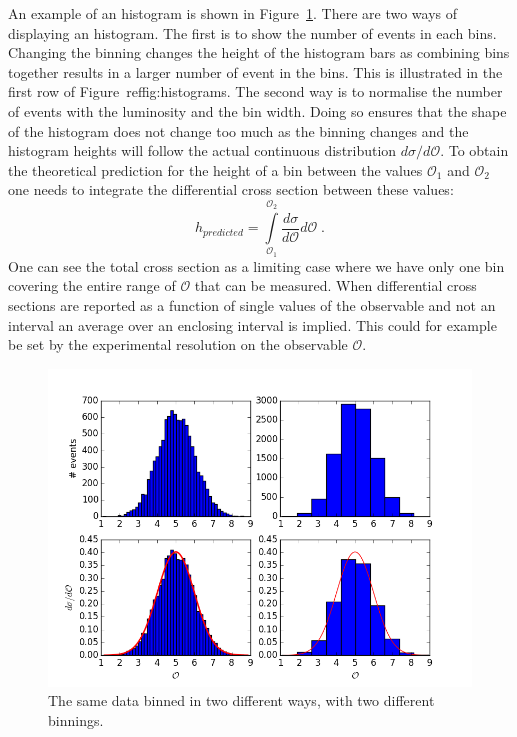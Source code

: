 \documentclass[12pt]{article}
\begin{document}
An example of an histogram is shown in Figure~\ref{fig:histograms}. There are two ways of displaying an histogram. The first is to show the number of events in each bins. Changing the binning changes the height of the histogram bars as combining bins together results in a larger number of event in the bins. This is illustrated in the first row of Figure~ref{fig:histograms}. The second way is to normalise the number of events with the luminosity and the bin width. Doing so ensures that the shape of the histogram does not change too much as the binning changes and the histogram heights will follow the actual continuous distribution $d\sigma/d\mathcal{O}$. To obtain the theoretical prediction for the height of a bin between the values $\mathcal{O}_1$ and $\mathcal{O}_2$ one needs to integrate the differential cross section between these values:
\[h_{predicted}=\int\limits_{\mathcal{O}_1}^{\mathcal{O}_2}\frac{d\sigma}{d\mathcal{O}}d\mathcal{O}\;.\]
One can see the total cross section as a limiting case where we have only one bin covering the entire range of $\mathcal{O}$ that can be measured. When differential cross sections are reported as a function of single values of the observable and not an interval an average over an enclosing interval is implied. This could for example be set by the experimental resolution on the observable $\mathcal{O}$.   
\begin{figure}
\includegraphics[scale=0.8]{images/histograms.png}  
\caption{The same data binned in two different ways, with two different binnings. }\label{fig:histograms}\end{figure}
\end{document}
